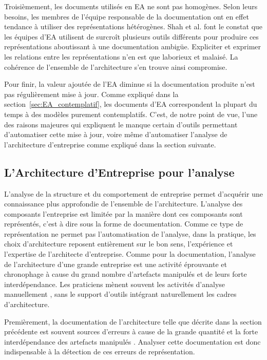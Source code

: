 Troisièmement, les documents utilisés en EA ne sont pas homogènes. Selon
leurs besoins, les membres de l'équipe responsable de la documentation ont en
effet tendance à utiliser des représentations hétérogènes. Shah et al.
\cite{shah2007frameworks} font le constat que les équipes d'EA utilisent de
surcroît plusieurs outils différents pour produire ces représentations
aboutissant à une documentation ambigüe. Expliciter et exprimer les relations
entre les représentations n'en est que laborieux et malaisé. La cohérence de
l'ensemble de l'architecture s'en trouve ainsi compromise.

 Pour finir, la valeur ajoutée de l'EA diminue si la documentation produite
n'est pas régulièrement mise à jour. Comme expliqué dans la
section~\ref{sec:EA_contemplatif}, les documents d'EA correspondent la plupart
du temps à des modèles purement contemplatifs. C'est, de notre point de vue,
l'une des raisons majeures qui expliquent le manque certain d'outils permettant
d'automatiser cette mise à jour, voire même d'automatiser l'analyse de
l'architecture d'entreprise comme expliqué dans la section suivante.


	\subsection{L'Architecture d'Entreprise pour l'analyse}
	\label{sec:EA_analyse_limite}

L'analyse de la structure et du comportement de entreprise permet d'acquérir
une connaissance plus approfondie de l'ensemble de l'architecture. L'analyse des
composants l'entreprise est limitée par la manière dont ces composants sont
représentés, c'est à dire sous la forme de documentation. Comme ce type de
représentation ne permet pas l'automatisation de l'analyse, dans la pratique,
les choix d'architecture reposent entièrement sur le bon sens, l'expérience et
l'expertise de l'architecte d'entreprise. Comme pour la documentation, l'analyse
de l'architecture d'une grande entreprise est une activité éprouvante et
chronophage à cause du grand nombre d'artefacts manipulés et de leurs forte
interdépendance. Les praticiens mènent souvent les activités d'analyse
manuellement \cite{barn2013enterprise}, sans le support d'outils intégrant
naturellement les cadres d'architecture.

Premièrement, la documentation de l'architecture telle que décrite dans la
section précédente est souvent sources d'erreurs à cause de la grande quantité
et la forte interdépendance des artefacts manipulés
\cite{kaisler_enterprise_2005}. Analyser cette documentation est donc
indispensable à la détection de ces erreurs de représentation.

